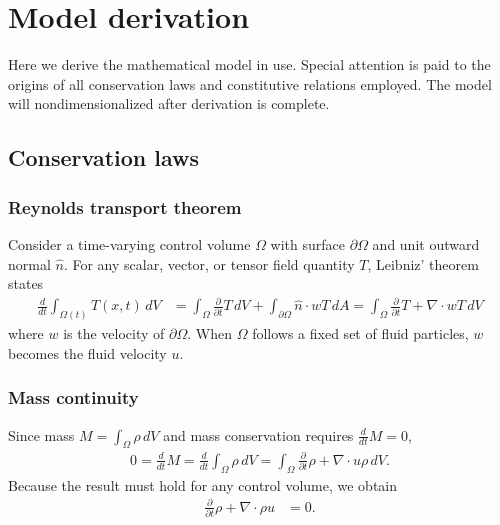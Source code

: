 \documentclass[letterpaper,11pt,nointlimits,reqno]{amsart}
\begin{document}
\section{Model derivation}

Here we derive the mathematical model in use.  Special attention is
paid to the origins of all conservation laws and constitutive relations
employed.  The model will nondimensionalized after derivation is complete.

\subsection{Conservation laws}

\subsubsection{Reynolds transport theorem}

Consider a time-varying control volume $\Omega$ with surface
$\partial\Omega$ and unit outward normal $\hat{n}$.  For any 
scalar, vector, or tensor field quantity
$T$, Leibniz' theorem states
\begin{align}
  \label{eq:rtt}
  \frac{d}{dt}\int_{\Omega(t)}T(x,t)\,dV
  &=
  \int_{\Omega}\frac{\partial}{\partial{}t}T\,dV
  +
  \int_{\partial\Omega} \hat{n}\cdot{}w T\,dA
  =
  \int_{\Omega}\frac{\partial}{\partial{}t}T+\nabla\cdot{}wT\,dV
\end{align}
where $w$ is the velocity of $\partial\Omega$.  When $\Omega$ follows
a fixed set of fluid particles, $w$ becomes the fluid velocity $u$.

\subsubsection{Mass continuity} 
Since mass $M=\int_{\Omega} \rho\,dV$
and mass conservation requires $\frac{d}{dt}M=0$,
\begin{align}
  0 = \frac{d}{dt}M 
  = \frac{d}{dt}\int_{\Omega} \rho\,dV
  =
  \int_{\Omega}\frac{\partial}{\partial{}t}\rho+\nabla\cdot{}u\rho{}\,dV.
\end{align}
Because the result must hold for any control volume, we obtain
\begin{align}
  \label{eq:cons_mass}
  \frac{\partial}{\partial{}t}\rho+\nabla\cdot\rho{}u &= 0
  .
\end{align}
\end{document}
